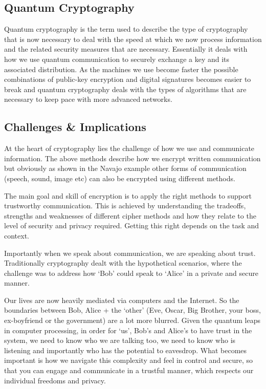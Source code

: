 \subsection{Quantum Cryptography}

Quantum cryptography is the term used to describe the type of
cryptography that is now necessary to deal with the speed at which we
now process information and the related security measures that are
necessary. Essentially it deals with how we use quantum communication to
securely exchange a key and its associated distribution. As the machines
we use become faster the possible combinations of public-key encryption
and digital signatures becomes easier to break and quantum cryptography
deals with the types of algorithms that are necessary to keep pace with
more advanced networks.

\subsection{Challenges \& Implications}

At the heart of cryptography lies the challenge of how we use and
communicate information. The above methods describe how we encrypt
written communication but obviously as shown in the Navajo example other
forms of communication (speech, sound, image etc) can also be encrypted
using different methods.

The main goal and skill of encryption is to apply the right methods to
support trustworthy communication. This is achieved by understanding the
tradeoffs, strengths and weaknesses of different cipher methods and how
they relate to the level of security and privacy required. Getting this
right depends on the task and context.

Importantly when we speak about communication, we are speaking about
trust. Traditionally cryptography dealt with the hypothetical scenarios,
where the challenge was to address how `Bob' could speak to `Alice' in a
private and secure manner.

Our lives are now heavily mediated via computers and the Internet. So
the boundaries between Bob, Alice + the `other' (Eve, Oscar, Big
Brother, your boss, ex-boyfriend or the government) are a lot more
blurred. Given the quantum leaps in computer processing, in order for
`us', Bob's and Alice's to have trust in the system, we need to know who
we are talking too, we need to know who is listening and importantly who
has the potential to eavesdrop. What becomes important is how we
navigate this complexity and feel in control and secure, so that you can
engage and communicate in a trustful manner, which respects our
individual freedoms and privacy.
